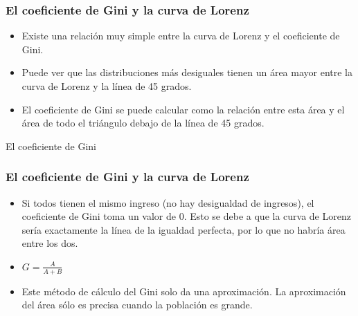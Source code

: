 \documentclass{beamer}
\begin{document}
\begin{frame} 
\frametitle{El coeficiente de Gini y la curva de Lorenz}
\begin{itemize}
\item Existe una relación muy simple entre la curva de Lorenz y el coeficiente de Gini. 
\item Puede ver que las distribuciones más desiguales tienen un área mayor entre la curva de Lorenz y la línea de 45 grados. 
\item El coeficiente de Gini se puede calcular como la relación entre esta área y el área de todo el triángulo debajo de la línea de 45 grados.
\end{itemize}
\end{frame}

\begin{frame}{El coeficiente de Gini}
    \begin{figure} [H]
\centering
{}
\end{figure} 
\end{frame}



\begin{frame} 
\frametitle{El coeficiente de Gini y la curva de Lorenz}
\begin{itemize}
\item Si todos tienen el mismo ingreso (no hay desigualdad de ingresos), el coeficiente de Gini toma un valor de 0. Esto se debe a que la curva de Lorenz sería exactamente la línea de la igualdad perfecta, por lo que no habría área entre los dos.
\item $G=\frac{A}{A+B}$
\item Este método de cálculo del Gini solo da una aproximación. La aproximación del área sólo es precisa cuando la población es grande.
\end{itemize}
\end{frame}
\end{document}
